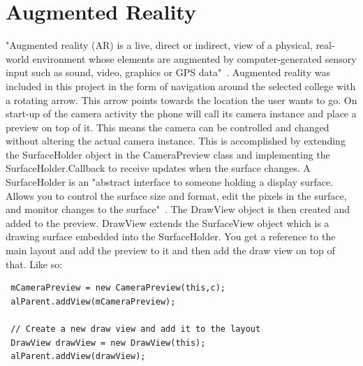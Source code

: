 \pagebreak
\section{Augmented Reality}
"Augmented reality (AR) is a live, direct or indirect, view of a physical, real-world environment whose elements are augmented by computer-generated sensory input such as sound, video, graphics or GPS data"~\cite{aug_wiki}. Augmented reality was included in this project in the form of navigation around the selected college with a rotating arrow. This arrow points towards the location the user wants to go. On start-up of the camera activity the phone will call its camera instance and place a preview on top of it. This means the camera can be controlled and changed without altering the actual camera instance. This is accomplished by extending the SurfaceHolder object in the CameraPreview class and implementing the SurfaceHolder.Callback to receive updates when the surface changes. A SurfaceHolder is an "abstract interface to someone holding a display surface. Allows you to control the surface size and format, edit the pixels in the surface, and monitor changes to the surface"~\cite{surfaceholder}. The DrawView object is then created and added to the preview. DrawView extends the SurfaceView object which is a drawing surface embedded into the SurfaceHolder. You get a reference to the main layout and add the preview to it and then add the draw view on top of that. Like so: 
\begin{verbatim}
 mCameraPreview = new CameraPreview(this,c);
 alParent.addView(mCameraPreview);
 
 // Create a new draw view and add it to the layout
 DrawView drawView = new DrawView(this);
 alParent.addView(drawView);
\end{verbatim}

